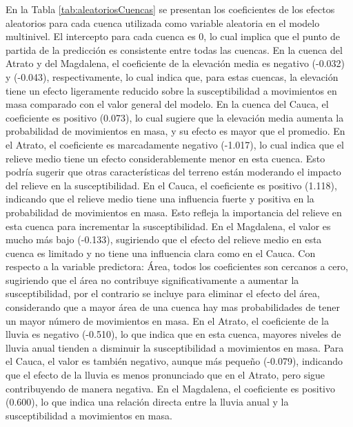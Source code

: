 \documentclass[
  manuscript=article,  
  layout=preprint,  
]{format}
\begin{document}
En la Tabla \ref{tab:aleatoriosCuencas} se presentan los coeficientes de los efectos aleatorios para cada cuenca utilizada como variable aleatoria en el modelo multinivel. El intercepto para cada cuenca es 0, lo cual implica que el punto de partida de la predicción es consistente entre todas las cuencas. En la cuenca del Atrato y del Magdalena, el coeficiente de la elevación media es negativo (-0.032) y (-0.043), respectivamente, lo cual indica que, para estas cuencas, la elevación tiene un efecto ligeramente reducido sobre la susceptibilidad a movimientos en masa comparado con el valor general del modelo. En la cuenca del Cauca, el coeficiente es positivo (0.073), lo cual sugiere que la elevación media aumenta la probabilidad de movimientos en masa, y su efecto es mayor que el promedio. En el Atrato, el coeficiente es marcadamente negativo (-1.017), lo cual indica que el relieve medio tiene un efecto considerablemente menor en esta cuenca. Esto podría sugerir que otras características del terreno están moderando el impacto del relieve en la susceptibilidad. En el Cauca, el coeficiente es positivo (1.118), indicando que el relieve medio tiene una influencia fuerte y positiva en la probabilidad de movimientos en masa. Esto refleja la importancia del relieve en esta cuenca para incrementar la susceptibilidad. En el Magdalena, el valor es mucho más bajo (-0.133), sugiriendo que el efecto del relieve medio en esta cuenca es limitado y no tiene una influencia clara como en el Cauca. Con respecto a la variable predictora: Área, todos los coeficientes son cercanos a cero, sugiriendo que el área no contribuye significativamente a aumentar la susceptibilidad, por el contrario se incluye para eliminar el efecto del área, considerando que a mayor área de una cuenca hay mas probabilidades de tener un mayor número de movimientos en masa. En el Atrato, el coeficiente de la lluvia es negativo (-0.510), lo que indica que en esta cuenca, mayores niveles de lluvia anual tienden a disminuir la susceptibilidad a movimientos en masa. Para el Cauca, el valor es también negativo, aunque más pequeño (-0.079), indicando que el efecto de la lluvia es menos pronunciado que en el Atrato, pero sigue contribuyendo de manera negativa. En el Magdalena, el coeficiente es positivo (0.600), lo que indica una relación directa entre la lluvia anual y la susceptibilidad a movimientos en masa.
\end{document}
